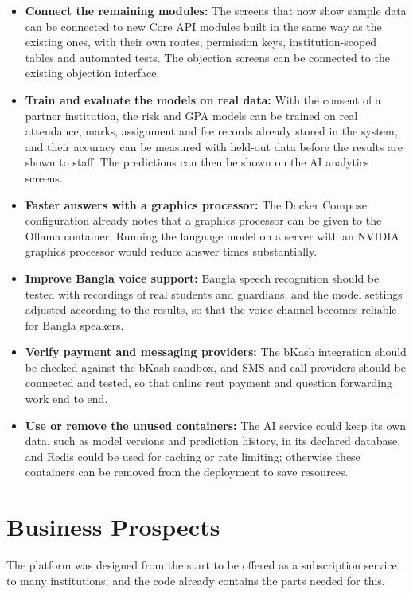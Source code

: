 \begin{itemize}
    \item \textbf{Connect the remaining modules:} The screens that now show sample data can be connected to new Core API modules built in the same way as the existing ones, with their own routes, permission keys, institution-scoped tables and automated tests. The objection screens can be connected to the existing objection interface.

    \item \textbf{Train and evaluate the models on real data:} With the consent of a partner institution, the risk and GPA models can be trained on real attendance, marks, assignment and fee records already stored in the system, and their accuracy can be measured with held-out data before the results are shown to staff. The predictions can then be shown on the AI analytics screens.

    \item \textbf{Faster answers with a graphics processor:} The Docker Compose configuration already notes that a graphics processor can be given to the Ollama container. Running the language model on a server with an NVIDIA graphics processor would reduce answer times substantially.

    \item \textbf{Improve Bangla voice support:} Bangla speech recognition should be tested with recordings of real students and guardians, and the model settings adjusted according to the results, so that the voice channel becomes reliable for Bangla speakers.

    \item \textbf{Verify payment and messaging providers:} The bKash integration should be checked against the bKash sandbox, and SMS and call providers should be connected and tested, so that online rent payment and question forwarding work end to end.

    \item \textbf{Use or remove the unused containers:} The AI service could keep its own data, such as model versions and prediction history, in its declared database, and Redis could be used for caching or rate limiting; otherwise these containers can be removed from the deployment to save resources.
\end{itemize}

\section{Business Prospects}
The platform was designed from the start to be offered as a subscription service to many institutions, and the code already contains the parts needed for this.

